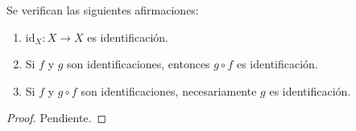 

\begin{proposition}
Se verifican las siguientes afirmaciones:
\begin{enumerate}[label=\textnormal{(\roman*)}]
\item $\text{id}_X : X \longrightarrow X$ es identificación.
\item Si $f$ y $g$ son identificaciones, entonces $g \circ f$ es identificación.
\item Si $f$ y $g \circ f$ son identificaciones, necesariamente $g$ es identificación.
\end{enumerate}
\end{proposition}

\begin{proof}
Pendiente.
\end{proof}
